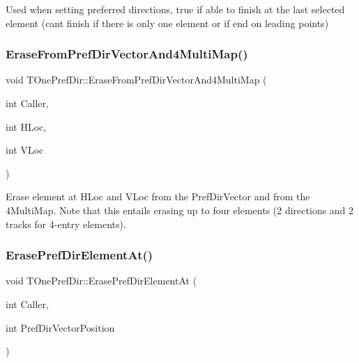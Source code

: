 Used when setting preferred directions, true if able to finish at the last selected element (can\textquotesingle{}t finish if there is only one element or if end on leading points) \mbox{\label{class_t_one_pref_dir_a8042c0e2fd7f9e39c3ca2a7bff7c68a4}} 
\subsubsection{\texorpdfstring{Erase\+From\+Pref\+Dir\+Vector\+And4\+Multi\+Map()}{EraseFromPrefDirVectorAnd4MultiMap()}}
{\footnotesize\ttfamily void T\+One\+Pref\+Dir\+::\+Erase\+From\+Pref\+Dir\+Vector\+And4\+Multi\+Map (\begin{DoxyParamCaption}\item[{int}]{Caller,  }\item[{int}]{H\+Loc,  }\item[{int}]{V\+Loc }\end{DoxyParamCaption})}

Erase element at H\+Loc and V\+Loc from the Pref\+Dir\+Vector and from the 4\+Multi\+Map. Note that this entails erasing up to four elements (2 directions and 2 tracks for 4-\/entry elements). \mbox{\label{class_t_one_pref_dir_aa191ffa7fa23838043d34d9b02cd7bcb}} 
\subsubsection{\texorpdfstring{Erase\+Pref\+Dir\+Element\+At()}{ErasePrefDirElementAt()}}
{\footnotesize\ttfamily void T\+One\+Pref\+Dir\+::\+Erase\+Pref\+Dir\+Element\+At (\begin{DoxyParamCaption}\item[{int}]{Caller,  }\item[{int}]{Pref\+Dir\+Vector\+Position }\end{DoxyParamCaption})\hspace{0.3cm}{\ttfamily [private]}}

